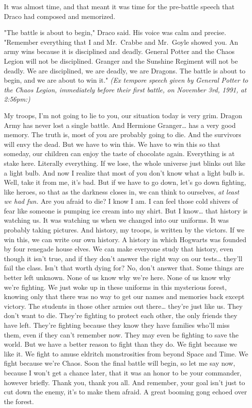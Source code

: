 It was almost time, and that meant it was time for the pre-battle speech that 
Draco had composed and memorized.

"The battle is about to begin," Draco said. His voice was calm and precise. 
"Remember everything that I and Mr.~Crabbe and Mr.~Goyle showed you. An army 
wins because it is disciplined and deadly. General Potter and the Chaos Legion 
will not be disciplined. Granger and the Sunshine Regiment will not be deadly. 
We are disciplined, we are deadly, we are Dragons. The battle is about to 
begin, and we are about to win it."
\sbreak
\emph{(Ex tempore speech given by General Potter to the Chaos Legion, 
immediately before their first battle, on November 3rd, 1991, at 2:56pm:)}

My troops, I'm not going to lie to you, our situation today is very grim. 
Dragon Army has never lost a single battle. And Hermione Granger{\ldots} has a 
very good memory. The truth is, most of you are probably going to die. And the 
survivors will envy the dead. But we have to win this. We have to win this so 
that someday, our children can enjoy the taste of chocolate again. Everything 
is at stake here. Literally everything. If we lose, the whole universe just 
blinks out like a light bulb. And now I realize that most of you don't know 
what a light bulb is. Well, take it from me, it's bad. But if we have to go 
down, let's go down fighting, like heroes, so that as the darkness closes in, 
we can think to ourselves, \emph{at least we had fun.} Are you afraid to die? I 
know I am. I can feel those cold shivers of fear like someone is pumping ice 
cream into my shirt. But I know{\ldots} that history is watching us. It was 
watching us when we changed into our uniforms. It was probably taking pictures. 
And history, my troops, is written by the victors. If we win this, we can write 
our own history. A history in which Hogwarts was founded by four renegade house 
elves. We can make everyone study that history, even though it isn't true, and 
if they don't answer the right way on our tests{\ldots} they'll fail the class. 
Isn't that worth dying for? No, don't answer that. Some things are better left 
unknown. None of us know why we're here. None of us know why we're fighting. We 
just woke up in these uniforms in this mysterious forest, knowing only that 
there was no way to get our names and memories back except victory. The 
students in those other armies out there{\ldots} they're just like us. They 
don't want to die. They're fighting to protect each other, the only friends 
they have left. They're fighting because they know they have families who'll 
miss them, even if they can't remember now. They may even be fighting to save 
the world. But we have a better reason to fight than they do. We fight because 
we like it. We fight to amuse eldritch monstrosities from beyond Space and 
Time. We fight because we're Chaos. Soon the final battle will begin, so let me 
say now, because I won't get a chance later, that it was an honor to be your 
commander, however briefly. Thank you, thank you all. And remember, your goal 
isn't just to cut down the enemy, it's to make them afraid.
\sbreak
A great booming gong echoed over the forest.

